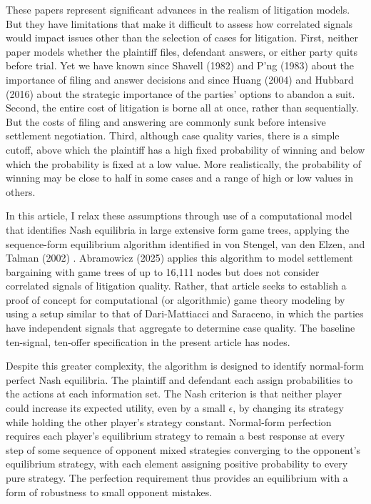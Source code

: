 \documentclass{article}
\begin{document}
These papers represent significant advances in the realism of litigation models. But they have limitations that make it difficult to assess how correlated signals would impact issues other than the selection of cases for litigation. First, neither paper models whether the plaintiff files, defendant answers, or either party quits before trial. Yet we have known since Shavell (1982) \cite{shavell} and P'ng (1983) \cite{png} about the importance of filing and answer decisions and since Huang (2004) \cite{huang} and Hubbard (2016) \cite{hubbard} about the strategic importance of the parties' options to abandon a suit. Second, the entire cost of litigation is borne all at once, rather than sequentially. But the costs of filing and answering are commonly sunk before intensive settlement negotiation. Third, although case quality varies, there is a simple cutoff, above which the plaintiff has a high fixed probability of winning and below which the probability is fixed at a low value. More realistically, the probability of winning may be close to half in some cases and a range of high or low values in others. 

In this article, I relax these assumptions through use of a computational model that identifies Nash equilibria in large extensive form game trees, applying the sequence-form equilibrium algorithm identified in von Stengel, van den Elzen, and Talman (2002) \cite{vonstengelvandenelzentalman}. Abramowicz (2025) applies this algorithm to model settlement bargaining with game trees of up to 16,111 nodes but does not consider correlated signals of litigation quality. Rather, that article seeks to establish a proof of concept for computational (or algorithmic) game theory modeling by using a setup similar to that of Dari-Mattiacci and Saraceno, in which the parties have independent signals that aggregate to determine case quality. The baseline ten-signal, ten-offer specification in the present article has \ArticleBaselineNodes{} nodes.

Despite this greater complexity, the algorithm is designed to identify normal-form perfect Nash equilibria. The plaintiff and defendant each assign probabilities to the actions at each information set. The Nash criterion is that neither player could increase its expected utility, even by a small $\epsilon$, by changing its strategy while holding the other player's strategy constant. Normal-form perfection requires each player's equilibrium strategy to remain a best response at every step of some sequence of opponent mixed strategies converging to the opponent's equilibrium strategy, with each element assigning positive probability to every pure strategy. The perfection requirement thus provides an equilibrium with a form of robustness to small opponent mistakes.
\end{document}
